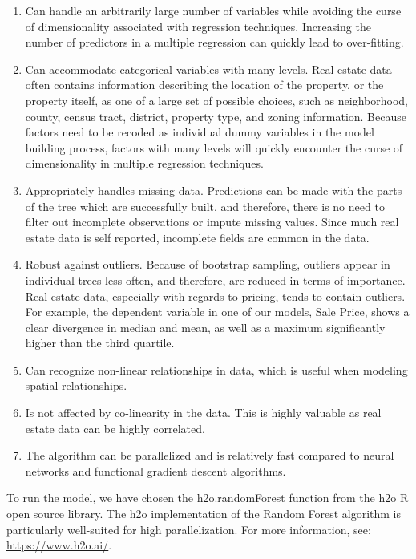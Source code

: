 \documentclass[12pt,]{article}
\providecommand{\tightlist}{%
  \setlength{\itemsep}{0pt}\setlength{\parskip}{0pt}}
\begin{document}
\begin{enumerate}
\def\labelenumi{\arabic{enumi}.}
\tightlist
\item
  Can handle an arbitrarily large number of variables while avoiding the
  curse of dimensionality associated with regression techniques.
  Increasing the number of predictors in a multiple regression can
  quickly lead to over-fitting.
\item
  Can accommodate categorical variables with many levels. Real estate
  data often contains information describing the location of the
  property, or the property itself, as one of a large set of possible
  choices, such as neighborhood, county, census tract, district,
  property type, and zoning information. Because factors need to be
  recoded as individual dummy variables in the model building process,
  factors with many levels will quickly encounter the curse of
  dimensionality in multiple regression techniques.
\item
  Appropriately handles missing data. Predictions can be made with the
  parts of the tree which are successfully built, and therefore, there
  is no need to filter out incomplete observations or impute missing
  values. Since much real estate data is self reported, incomplete
  fields are common in the data.
\item
  Robust against outliers. Because of bootstrap sampling, outliers
  appear in individual trees less often, and therefore, are reduced in
  terms of importance. Real estate data, especially with regards to
  pricing, tends to contain outliers. For example, the dependent
  variable in one of our models, Sale Price, shows a clear divergence in
  median and mean, as well as a maximum significantly higher than the
  third quartile.
\item
  Can recognize non-linear relationships in data, which is useful when
  modeling spatial relationships.
\item
  Is not affected by co-linearity in the data. This is highly valuable
  as real estate data can be highly correlated.
\item
  The algorithm can be parallelized and is relatively fast compared to
  neural networks and functional gradient descent algorithms.
\end{enumerate}

To run the model, we have chosen the h2o.randomForest function from the
h2o R open source library. The h2o implementation of the Random Forest
algorithm is particularly well-suited for high parallelization. For more
information, see: \url{https://www.h2o.ai/}.
\end{document}

